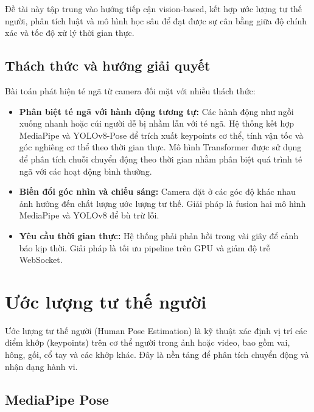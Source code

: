 Đề tài này tập trung vào hướng tiếp cận vision-based, kết hợp ước lượng tư thế người, phân tích luật và mô hình học sâu để đạt được sự cân bằng giữa độ chính xác và tốc độ xử lý thời gian thực.

\subsection{Thách thức và hướng giải quyết}

Bài toán phát hiện té ngã từ camera đối mặt với nhiều thách thức:

\begin{itemize}
    \item \textbf{Phân biệt té ngã với hành động tương tự:} Các hành động như ngồi xuống nhanh hoặc cúi người dễ bị nhầm lẫn với té ngã. Hệ thống kết hợp MediaPipe và YOLOv8-Pose để trích xuất keypoints cơ thể, tính vận tốc và góc nghiêng cơ thể theo thời gian thực. Mô hình Transformer được sử dụng để phân tích chuỗi chuyển động theo thời gian nhằm phân biệt quá trình té ngã với các hoạt động bình thường.


    \item \textbf{Biến đổi góc nhìn và chiếu sáng:} Camera đặt ở các góc độ khác nhau ảnh hưởng đến chất lượng ước lượng tư thế. Giải pháp là fusion hai mô hình MediaPipe và YOLOv8 để bù trừ lỗi.

    \item \textbf{Yêu cầu thời gian thực:} Hệ thống phải phản hồi trong vài giây để cảnh báo kịp thời. Giải pháp là tối ưu pipeline trên GPU và giảm độ trễ WebSocket.

    
\end{itemize}


\section{Ước lượng tư thế người}

Ước lượng tư thế người (Human Pose Estimation) là kỹ thuật xác định vị trí các điểm khớp (keypoints) trên cơ thể người trong ảnh hoặc video, bao gồm vai, hông, gối, cổ tay và các khớp khác. Đây là nền tảng để phân tích chuyển động và nhận dạng hành vi.

\subsection{MediaPipe Pose}

